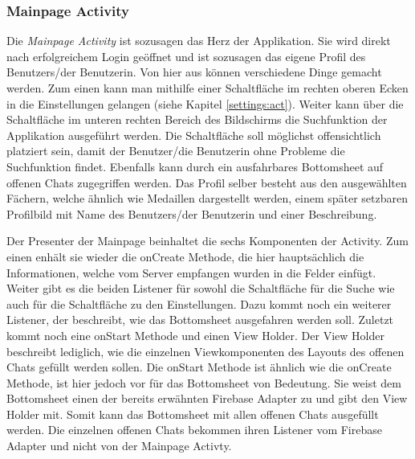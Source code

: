 \documentclass[a4paper,11pt]{report}
\begin{document}
				\subsubsection{Mainpage Activity} \label{mainpage:act}
				Die \emph{Mainpage Activity} ist sozusagen das Herz der Applikation. Sie wird direkt nach erfolgreichem Login geöffnet und ist sozusagen das eigene Profil des Benutzers/der Benutzerin. Von hier aus können verschiedene Dinge gemacht werden. Zum einen kann man mithilfe einer Schaltfläche im rechten oberen Ecken in die Einstellungen gelangen (siehe Kapitel \ref{settings:act}). Weiter kann über die Schaltfläche im unteren rechten Bereich des Bildschirms die Suchfunktion der Applikation ausgeführt werden. Die Schaltfläche soll möglichst offensichtlich platziert sein, damit der Benutzer/die Benutzerin ohne Probleme die Suchfunktion findet. Ebenfalls kann durch ein ausfahrbares Bottomsheet auf offenen Chats zugegriffen werden. Das Profil selber besteht aus den ausgewählten Fächern, welche ähnlich wie Medaillen dargestellt werden, einem später setzbaren Profilbild mit Name des Benutzers/der Benutzerin und einer Beschreibung.
				
				Der Presenter der Mainpage beinhaltet die sechs Komponenten der Activity. Zum einen enhält sie wieder die onCreate Methode, die hier hauptsächlich die Informationen, welche vom Server empfangen wurden in die Felder einfügt. Weiter gibt es die beiden Listener für sowohl die Schaltfläche für die Suche wie auch für die Schaltfläche zu den Einstellungen. Dazu kommt noch ein weiterer Listener, der beschreibt, wie das Bottomsheet ausgefahren werden soll. Zuletzt kommt noch eine onStart Methode und einen View Holder. Der View Holder beschreibt lediglich, wie die einzelnen Viewkomponenten des Layouts des offenen Chats gefüllt werden sollen. Die onStart Methode ist ähnlich wie die onCreate Methode, ist hier jedoch vor für das Bottomsheet von Bedeutung. Sie weist dem Bottomsheet einen der bereits erwähnten Firebase Adapter zu und gibt den View Holder mit. Somit kann das Bottomsheet mit allen offenen Chats ausgefüllt werden. Die einzelnen offenen Chats bekommen ihren Listener vom Firebase Adapter und nicht von der Mainpage Activty.
				
\end{document}
